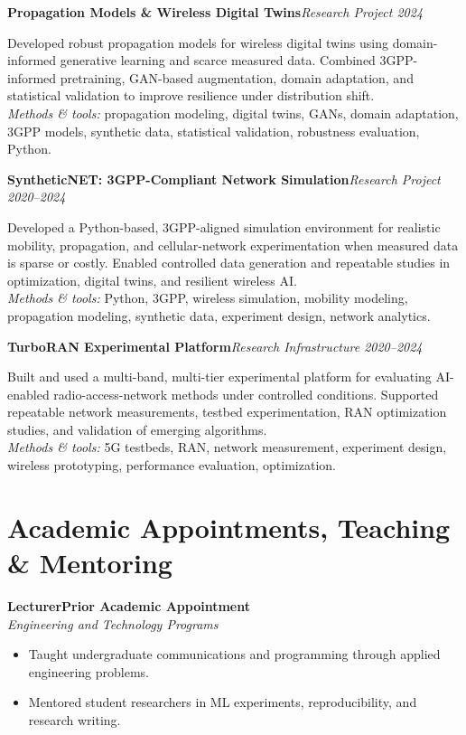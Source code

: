 \documentclass[9pt,letterpaper]{extarticle}
\newcommand{\role}[4]{\Needspace{4\baselineskip}\textbf{#1}\hfill\textbf{#2}\\[-1pt]\textit{#3}\hfill\textit{#4}\par}
\newcommand{\project}[3]{\Needspace{5\baselineskip}\textbf{#1}\hfill\textit{#2 \textbar{} #3}\par}
\begin{document}
\project{Propagation Models \& Wireless Digital Twins}{Research Project}{2024}
Developed robust propagation models for wireless digital twins using domain-informed generative learning and scarce measured data. Combined 3GPP-informed pretraining, GAN-based augmentation, domain adaptation, and statistical validation to improve resilience under distribution shift.\\[-1pt]
{\small\textit{Methods \& tools:} propagation modeling, digital twins, GANs, domain adaptation, 3GPP models, synthetic data, statistical validation, robustness evaluation, Python.}

\project{SyntheticNET: 3GPP-Compliant Network Simulation}{Research Project}{2020--2024}
Developed a Python-based, 3GPP-aligned simulation environment for realistic mobility, propagation, and cellular-network experimentation when measured data is sparse or costly. Enabled controlled data generation and repeatable studies in optimization, digital twins, and resilient wireless AI.\\[-1pt]
{\small\textit{Methods \& tools:} Python, 3GPP, wireless simulation, mobility modeling, propagation modeling, synthetic data, experiment design, network analytics.}

\project{TurboRAN Experimental Platform}{Research Infrastructure}{2020--2024}
Built and used a multi-band, multi-tier experimental platform for evaluating AI-enabled radio-access-network methods under controlled conditions. Supported repeatable network measurements, testbed experimentation, RAN optimization studies, and validation of emerging algorithms.\\[-1pt]
{\small\textit{Methods \& tools:} 5G testbeds, RAN, network measurement, experiment design, wireless prototyping, performance evaluation, optimization.}

\section{Academic Appointments, Teaching \& Mentoring}
\role{Lecturer}{Prior Academic Appointment}{Engineering and Technology Programs}{}
\begin{itemize}
\item Taught undergraduate communications and programming through applied engineering problems.
\item Mentored student researchers in ML experiments, reproducibility, and research writing.
\end{itemize}
\end{document}
